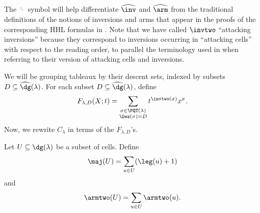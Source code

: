 \begin{remark} 
The $\,\widehat{\cdot}\,$ symbol will help differentiate $\widehat{\inv}$ and $\widehat{\arm}$ from the traditional definitions of the notions of inversions and arms that appear in the proofs of the corresponding HHL formulas  in \cite[Section 3]{HHL05}. Note that we have called $\invtwo$ ``attacking inversions'' because they correspond to inversions occurring in ``attacking cells'' with respect to the reading order, to parallel the terminology used in \cite{HHL05} when referring to their version of attacking cells and inversions. 
\end{remark}

We will be grouping tableaux by their descent sets, indexed by subsets $D\subseteq \widehat{\dg}(\lambda)$. For each subset $D\subseteq \widehat{\dg}(\lambda)$, define
\begin{equation}\label{eq:F_D}
F_{\lambda,D}(X;t) = \sum_{\substack{\sigma\in\PQT(\lambda)\\ \Des(\sigma)=D}}  t^{\invtwo(\sigma)} x^{\sigma}.
\end{equation}
Now, we rewrite $C_{\lambda}$ in terms of the $F_{\lambda,D}$'s.

\begin{defn}
Let $U\subseteq \dg(\lambda)$ be a subset of cells. Define
\[
\maj(U) = \sum_{u\in U} (\leg(u)+1)
\]
and
\[
\armtwo(U)=\sum_{u\in U} \armtwo(u).
\]
\end{defn}

